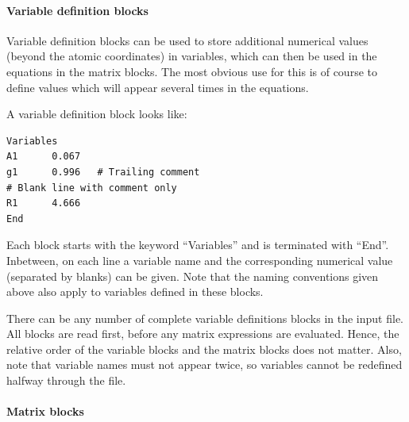 \documentclass[a4paper,11pt,DIV=15,openany,twoside=false]{scrbook}
\newenvironment{example}{
  \vspace{0mm}
  \definecolor{shadecolor}{HTML}{BBDDFF}
  \begin{shaded}
  \begin{minipage}{0.9\textwidth}
}{
  \end{minipage}
  \end{shaded}
}
\begin{document}
\paragraph{Variable definition blocks}

Variable definition blocks can be used to store additional numerical values (beyond the atomic coordinates) in variables, which can then be used in the equations in the matrix blocks. The most obvious use for this is of course to define values which will appear several times in the equations.

A variable definition block looks like:
\begin{example}
  \begin{verbatim}
Variables
A1      0.067
g1      0.996   # Trailing comment
# Blank line with comment only
R1      4.666
End
  \end{verbatim}
\end{example}
Each block starts with the keyword ``Variables'' and is terminated with ``End''. Inbetween, on each line a variable name and the corresponding numerical value (separated by blanks) can be given. Note that the naming conventions given above also apply to variables defined in these blocks. 

There can be any number of complete variable definitions blocks in the input file. All blocks are read first, before any matrix expressions are evaluated. Hence, the relative order of the variable blocks and the matrix blocks does not matter. Also, note that variable names must not appear twice, so variables cannot be redefined halfway through the file.

\paragraph{Matrix blocks}
\end{document}
